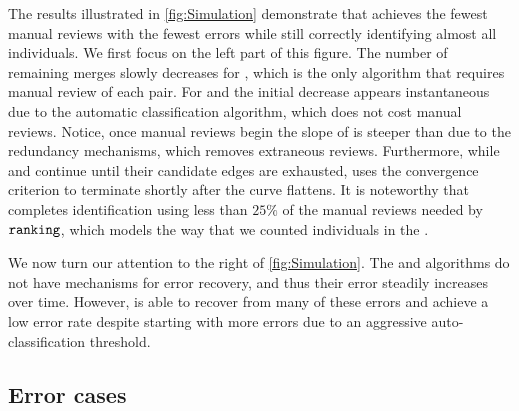     \Simulation{}

    \Refresh{}

    The results illustrated in \cref{fig:Simulation} demonstrate that  achieves the fewest manual
      reviews with the fewest errors while still correctly identifying almost all individuals.
    We first focus on the left part of this figure.
    The number of remaining merges slowly decreases for , which is the only algorithm that requires
      manual review of each pair.
    For  and  the initial decrease appears instantaneous due to the automatic
      classification algorithm, which does not cost manual reviews.
    Notice, once manual reviews begin the slope of  is steeper than  due to the
      redundancy mechanisms, which removes extraneous reviews.
    Furthermore, while  and  continue until their candidate edges are exhausted,
       uses the convergence criterion to terminate shortly after the curve flattens.
    It is noteworthy that  completes identification using less than $25\percent$ of the manual
      reviews needed by ${\tt{ranking}}$, which models the way that we counted individuals in the \GZC{}.

    We now turn our attention to the right of \cref{fig:Simulation}.
    The  and  algorithms do not have mechanisms for error recovery, and thus their
      error steadily increases over time.
    However,  is able to recover from many of these errors and achieve a low error rate despite
      starting with more errors due to an aggressive auto-classification threshold.
      
    \subsection{Error cases}


